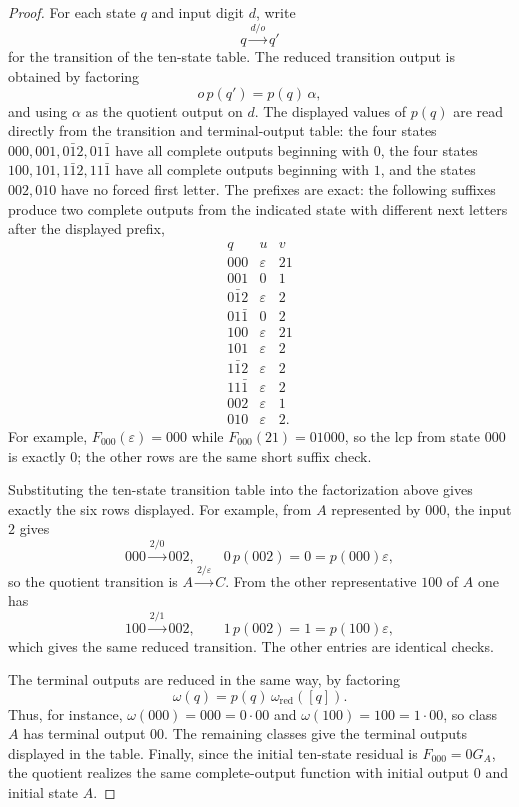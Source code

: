 \documentclass[11pt,letterpaper]{article}
\numberwithin{equation}{section}
\theoremstyle{plain}
\theoremstyle{definition}
\theoremstyle{remark}
\begin{document}
\begin{proof}
For each state $q$ and input digit $d$, write
\[
q\xrightarrow{d/o} q'
\]
for the transition of the ten-state table.  The reduced transition output is
obtained by factoring
\[
o\,p(q')=p(q)\,\alpha,
\]
and using $\alpha$ as the quotient output on $d$.  The displayed values of
$p(q)$ are read directly from the transition and terminal-output table: the
four states $000,001,0\bar{1}2,01\bar{1}$ have all complete outputs beginning
with $0$, the four states $100,101,1\bar{1}2,11\bar{1}$ have all complete
outputs beginning with $1$, and the states $002,010$ have no forced first
letter.
The prefixes are exact: the following suffixes produce two complete outputs
from the indicated state with different next letters after the displayed
prefix,
\[
\begin{array}{c|c|c}
q&u&v\\
\hline
000&\varepsilon&21\\
001&0&1\\
0\bar{1}2&\varepsilon&2\\
01\bar{1}&0&2\\
100&\varepsilon&21\\
101&\varepsilon&2\\
1\bar{1}2&\varepsilon&2\\
11\bar{1}&\varepsilon&2\\
002&\varepsilon&1\\
010&\varepsilon&2 .
\end{array}
\]
For example, $F_{000}(\varepsilon)=000$ while $F_{000}(21)=01000$, so the lcp
from state $000$ is exactly $0$; the other rows are the same short suffix
check.

Substituting the ten-state transition table into the factorization above gives
exactly the six rows displayed.  For example, from $A$ represented by $000$,
the input $2$ gives
\[
000\xrightarrow{2/0}002,\qquad 0\,p(002)=0=p(000)\varepsilon,
\]
so the quotient transition is $A\xrightarrow{2/\varepsilon}C$.  From the other
representative $100$ of $A$ one has
\[
100\xrightarrow{2/1}002,\qquad 1\,p(002)=1=p(100)\varepsilon,
\]
which gives the same reduced transition.  The other entries are identical
checks.

The terminal outputs are reduced in the same way, by factoring
\[
\omega(q)=p(q)\,\omega_{\mathrm{red}}([q]).
\]
Thus, for instance, $\omega(000)=000=0\cdot 00$ and
$\omega(100)=100=1\cdot 00$, so class $A$ has terminal output $00$.
The remaining classes give the terminal outputs displayed in the table.
Finally, since the initial ten-state residual is $F_{000}=0G_A$, the quotient
realizes the same complete-output function with initial output $0$ and initial
state $A$.
\end{proof}
\end{document}
